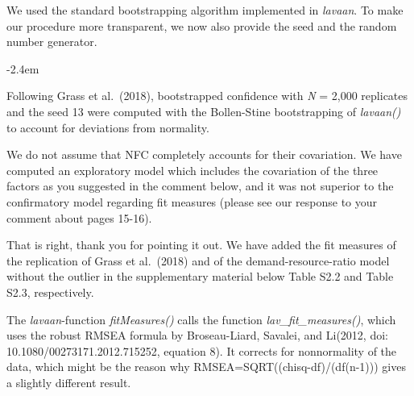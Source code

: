 \documentclass[draft]{article}
\renewenvironment{quote}{\begin{fquote}\advance\leftmargini -2.4em\begin{oldquote}}{\end{oldquote}\end{fquote}}
\newenvironment{fquote}
  {\def\FrameCommand{
	\fboxsep=0.6em %
	\fcolorbox{black}{white}}%
    \MakeFramed {\advance\hsize-2\width \FrameRestore}
    \begin{minipage}{\linewidth}
  }
  {\end{minipage}\endMakeFramed}
\begin{document}
We used the standard bootstrapping algorithm implemented in \emph{lavaan}.
To make our procedure more transparent, we now also provide the seed and the random number generator.

\begin{quote}
Following Grass et al.~(2018), bootstrapped confidence with \emph{N} = 2,000 replicates and the seed 13 were computed with the Bollen-Stine bootstrapping of \emph{lavaan()} to account for deviations from normality.
\end{quote}


We do not assume that NFC completely accounts for their covariation.
We have computed an exploratory model which includes the covariation of the three factors as you suggested in the comment below, and it was not superior to the confirmatory model regarding fit measures (please see our response to your comment about pages 15-16).


That is right, thank you for pointing it out.
We have added the fit measures of the replication of Grass et al.~(2018) and of the demand-resource-ratio model without the outlier in the supplementary material below Table S2.2 and Table S2.3, respectively.


The \emph{lavaan}-function \emph{fitMeasures()} calls the function \emph{lav\_fit\_measures()}, which uses the robust RMSEA formula by Broseau-Liard, Savalei, and Li(2012, doi: 10.1080/00273171.2012.715252, equation 8).
It corrects for nonnormality of the data, which might be the reason why RMSEA=SQRT((chisq-df)/(df(n-1))) gives a slightly different result.

\end{document}
